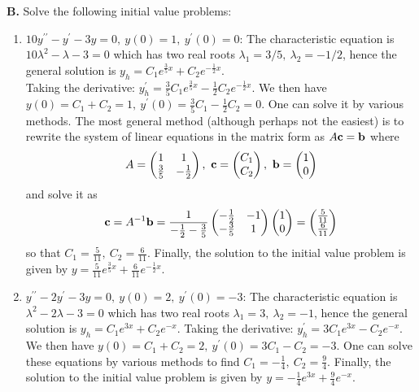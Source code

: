 \documentclass[11pt,a4paper,twoside]{article}
\begin{document}
	\textbf{B.} Solve the following initial value problems:
	\begin{enumerate}
		\item $10y^{\prime\prime} - y^\prime - 3y = 0,\ y(0) = 1,\ y^\prime(0) = 0$: The characteristic equation is $10\lambda^2-\lambda-3=0$ which has two real roots $\lambda_1 = 3/5,\ \lambda_2 = -1/2$, hence the general solution is $y_h = C_1e^{\frac{3}{5}x}+C_2e^{-\frac{1}{2}x}$.\\
		Taking the derivative: $y^\prime_h = \frac{3}{5}C_1e^{\frac{3}{5}x} - \frac{1}{2}C_2e^{-\frac{1}{2}x}$. We then have $y(0) = C_1 + C_2 = 1,\ y^\prime(0) = \frac{3}{5}C_1-\frac{1}{2}C_2 = 0$. One can solve it by various methods. The most general method  (although perhaps not the easiest) is to rewrite the system of linear equations in the matrix form as $A\vb{c} = \vb{b}$ where
		$$
		A
		=
		\begin{pmatrix}
			1 & 1\\
			\frac{3}{5} & -\frac{1}{2}
		\end{pmatrix},\ 
		\vb{c}
		=
		\begin{pmatrix}
			C_1\\
			C_2
		\end{pmatrix},\ 
		\vb{b}
		=
		\begin{pmatrix}
			1\\
			0
		\end{pmatrix}
		$$
		and solve it as
		$$
		\vb{c} = A^{-1}\vb{b} = \frac{1}{-\frac{1}{2}-\frac{3}{5}}
		\begin{pmatrix}
			-\frac{1}{2} & -1\\
			-\frac{3}{5} & 1
		\end{pmatrix}
		\begin{pmatrix}
			1\\
			0
		\end{pmatrix}
		=
		\begin{pmatrix}
			\frac{5}{11}\\
			\frac{6}{11}
		\end{pmatrix}
		$$
		so that
		$C_1 = \frac{5}{11},\ C_2 = \frac{6}{11}$. Finally, the solution to the initial value problem is given by $y = \frac{5}{11}e^{\frac{3}{5}x}+\frac{6}{11}e^{-\frac{1}{2}x}$.
		\item $y^{\prime\prime} - 2y^\prime - 3y = 0,\ y(0)=2,\ y^\prime(0) = -3$: The characteristic equation is $\lambda^2 - 2\lambda -3 = 0$ which has two real roots $\lambda_1 = 3,\ \lambda_2 = −1$, hence the general solution is $y_h = C_1e^{3x} + C_2e^{-x}$. Taking the derivative: $y^\prime_h = 3C_1e^{3x} - C_2e^{-x}$. We then have $y(0) = C_1 + C_2 = 2,\ y^\prime(0) = 3C_1 - C_2 = -3$.  One can solve these equations by various methods to find $C_1 = -\frac{1}{4},\ C_2 = \frac{9}{4}$.  Finally, the solution to the initial value problem is given by $y = -\frac{1}{4}e^{3x}+\frac{9}{4}e^{-x}$.

\end{enumerate}
\end{document}

